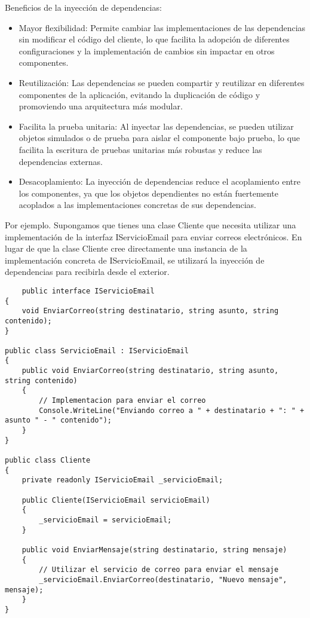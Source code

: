 \documentclass[executivepaper]{article}
\begin{document}
Beneficios de la inyección de dependencias:

\begin{itemize}
    \item Mayor flexibilidad: Permite cambiar las implementaciones de las dependencias sin modificar el código del cliente, lo que facilita la adopción de diferentes configuraciones y la implementación de cambios sin impactar en otros componentes.
    \item Reutilización: Las dependencias se pueden compartir y reutilizar en diferentes componentes de la aplicación, evitando la duplicación de código y promoviendo una arquitectura más modular.
    \item Facilita la prueba unitaria: Al inyectar las dependencias, se pueden utilizar objetos simulados o de prueba para aislar el componente bajo prueba, lo que facilita la escritura de pruebas unitarias más robustas y reduce las dependencias externas.
    \item Desacoplamiento: La inyección de dependencias reduce el acoplamiento entre los componentes, ya que los objetos dependientes no están fuertemente acoplados a las implementaciones concretas de sus dependencias.
\end{itemize}

Por ejemplo. Supongamos que tienes una clase Cliente que necesita utilizar una implementación de la interfaz IServicioEmail para enviar correos electrónicos. En lugar de que la clase Cliente cree directamente una instancia de la implementación concreta de IServicioEmail, se utilizará la inyección de dependencias para recibirla desde el exterior.

\begin{lstlisting}
    public interface IServicioEmail
{
    void EnviarCorreo(string destinatario, string asunto, string contenido);
}

public class ServicioEmail : IServicioEmail
{
    public void EnviarCorreo(string destinatario, string asunto, string contenido)
    {
        // Implementacion para enviar el correo
        Console.WriteLine("Enviando correo a " + destinatario + ": " + asunto " - " contenido");
    }
}

public class Cliente
{
    private readonly IServicioEmail _servicioEmail;

    public Cliente(IServicioEmail servicioEmail)
    {
        _servicioEmail = servicioEmail;
    }

    public void EnviarMensaje(string destinatario, string mensaje)
    {
        // Utilizar el servicio de correo para enviar el mensaje
        _servicioEmail.EnviarCorreo(destinatario, "Nuevo mensaje", mensaje);
    }
}
\end{lstlisting}
\end{document}
